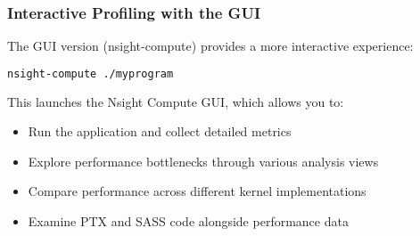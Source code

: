 \subsubsection{Interactive Profiling with the GUI}

The GUI version (nsight-compute) provides a more interactive experience:

\begin{lstlisting}[language=bash]
nsight-compute ./myprogram
\end{lstlisting}

This launches the Nsight Compute GUI, which allows you to:

\begin{itemize}
    \item Run the application and collect detailed metrics
    \item Explore performance bottlenecks through various analysis views
    \item Compare performance across different kernel implementations
    \item Examine PTX and SASS code alongside performance data
\end{itemize}

